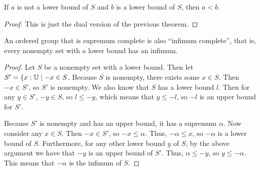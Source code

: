 \documentclass[../../math.tex]{subfiles}
\begin{document}
\begin{theorem} \label{lower_bound_leq}
    If $a$ is not a lower bound of $S$ and $b$ is a lower bound of $S$, then $a
    < b$.
\end{theorem}
\begin{proof}
    This is just the dual version of the previous theorem.
\end{proof}

\begin{theorem}
    An ordered group that is supremum complete is also ``infimum complete'',
    that is, every nonempty set with a lower bound has an infimum.
\end{theorem}
\begin{proof}
    Let $S$ be a nonempty set with a lower bound.  Then let $S' = \{x : \mathbb{U} \mid
    -x \in S$.  Because $S$ is nonempty, there exists some $x \in S$.  Then $-x
    \in S'$, so $S'$ is nonempty.  We also know that $S$ has a lower bound $l$.
    Then for any $y \in S'$, $-y \in S$, so $l \leq -y$, which means that $y
    \leq -l$, so $-l$ is an upper bound for $S'$.

    Because $S'$ is nonempty and has an upper bound, it has a supremum $\alpha$.
    Now consider any $x \in S$.  Then $-x \in S'$, so $-x \leq \alpha$.  Thus,
    $-\alpha \leq x$, so $-\alpha$ is a lower bound of $S$.  Furthermore, for
    any other lower bound $y$ of $S$, by the above argument we have that $-y$ is
    an upper bound of $S'$.  Thus, $\alpha \leq -y$, so $y \leq -\alpha$.  This
    means that $-\alpha$ is the infimum of $S$.
\end{proof}
\end{document}
